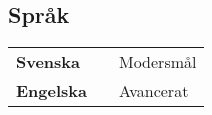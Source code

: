 \documentclass[lighthipster]{simplehipstercv}
\newlength{\rightcolwidth}
\begin{document}
\begin{paracol}{2}
\section*{Språk}
\begin{tabular}{l | ll}
\textbf{Svenska} &  & {\phantom{x}\footnotesize Modersmål} \\
\textbf{Engelska} &  & {\phantom{x}\footnotesize Avancerat}
\end{tabular}
\bigskip


\vfill{} %

\setlength{\parindent}{0pt}
\begin{minipage}[t]{\rightcolwidth}
\begin{center}\fontfamily{\sfdefault}\selectfont \color{black!70}
\end{center}
\end{minipage}

\end{paracol}
\end{document}
